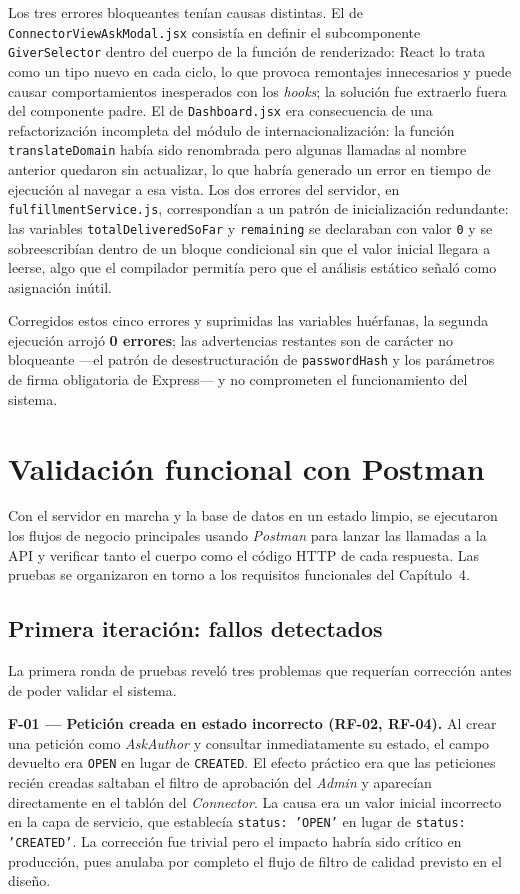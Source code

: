 \documentclass[11pt,oneside,spanish,listoffigures,listoftables]{tfgetsinf}
\begin{document}
Los tres errores bloqueantes tenían causas distintas. El de \texttt{ConnectorViewAskModal.jsx} consistía en definir el subcomponente \texttt{GiverSelector} dentro del cuerpo de la función de renderizado: React lo trata como un tipo nuevo en cada ciclo, lo que provoca remontajes innecesarios y puede causar comportamientos inesperados con los \textit{hooks}; la solución fue extraerlo fuera del componente padre. El de \texttt{Dashboard.jsx} era consecuencia de una refactorización incompleta del módulo de internacionalización: la función \texttt{translateDomain} había sido renombrada pero algunas llamadas al nombre anterior quedaron sin actualizar, lo que habría generado un error en tiempo de ejecución al navegar a esa vista. Los dos errores del servidor, en \texttt{fulfillmentService.js}, correspondían a un patrón de inicialización redundante: las variables \texttt{totalDeliveredSoFar} y \texttt{remaining} se declaraban con valor \texttt{0} y se sobreescribían dentro de un bloque condicional sin que el valor inicial llegara a leerse, algo que el compilador permitía pero que el análisis estático señaló como asignación inútil.

Corregidos estos cinco errores y suprimidas las variables huérfanas, la segunda ejecución arrojó \textbf{0 errores}; las advertencias restantes son de carácter no bloqueante —el patrón de desestructuración de \texttt{passwordHash} y los parámetros de firma obligatoria de Express— y no comprometen el funcionamiento del sistema.

\section{Validación funcional con Postman}

Con el servidor en marcha y la base de datos en un estado limpio, se ejecutaron los flujos de negocio principales usando \textit{Postman} para lanzar las llamadas a la API y verificar tanto el cuerpo como el código HTTP de cada respuesta. Las pruebas se organizaron en torno a los requisitos funcionales del Capítulo~4.

\subsection{Primera iteración: fallos detectados}

La primera ronda de pruebas reveló tres problemas que requerían corrección antes de poder validar el sistema.

\textbf{F-01 — Petición creada en estado incorrecto (RF-02, RF-04).} Al crear una petición como \textit{AskAuthor} y consultar inmediatamente su estado, el campo devuelto era \texttt{OPEN} en lugar de \texttt{CREATED}. El efecto práctico era que las peticiones recién creadas saltaban el filtro de aprobación del \textit{Admin} y aparecían directamente en el tablón del \textit{Connector}. La causa era un valor inicial incorrecto en la capa de servicio, que establecía \texttt{status: 'OPEN'} en lugar de \texttt{status: 'CREATED'}. La corrección fue trivial pero el impacto habría sido crítico en producción, pues anulaba por completo el flujo de filtro de calidad previsto en el diseño.
\end{document}
